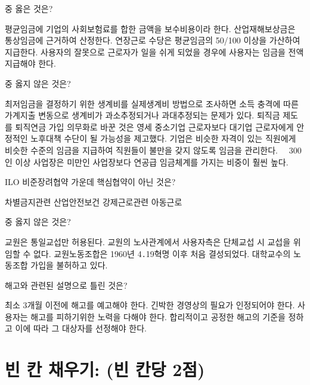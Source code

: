 \documentclass[11pt,answers]{exam} %
\begin{document}
\begin{questions}
 중 옳은 것은?
    \begin{choices}
    \CorrectChoice\relax 평균임금에 기업의 사회보험료를 합한 금액을 보수비용이라 한다.
    \choice\relax 산업재해보상금은 통상임금에 근거하여 산정한다.
    \choice\relax 연장근로 수당은 평균임금의 50/100 이상을 가산하여 지급한다.
    \choice\relax 사용자의 잘못으로 근로자가 일을 쉬게 되었을 경우에 사용자는 임금을 전액 지급해야 한다. 
    \end{choices}

 중 옳지 않은 것은?
    \begin{choices}
    \choice\relax 최저임금을 결정하기 위한 생계비를 실제생계비 방법으로 조사하면 소득 충격에 따른 가계지출 변동으로 생계비가 과소추정되거나 과대추정되는 문제가 있다. 
    \CorrectChoice\relax 퇴직금 제도를 퇴직연금 가입 의무화로 바꾼 것은 영세 중소기업 근로자보다 대기업 근로자에게 안정적인 노후대책 수단이 될 가능성을 제고했다.  
    \choice\relax 기업은 비슷한 자격이 있는 직원에게 비슷한 수준의 임금을 지급하여 직원들이 불만을 갖지 않도록 임금을 관리한다.
    \choice\relax　300인 이상 사업장은 미만인 사업장보다 연공급 임금체계를 가지는 비중이 훨씬 높다. 
    \end{choices}

 ILO 비준장려협약 가운데 핵심협약이 아닌 것은?
    \begin{choices}
    \choice\relax 차별금지관련
    \CorrectChoice\relax 산업안전보건
    \choice\relax 강제근로관련
    \choice\relax 아동근로
    \end{choices}

 중 옳지 않은 것은?
    \begin{choices}
    \choice\relax 교원은 통일교섭만 허용된다.
    \choice\relax 교원의 노사관계에서 사용자측은 단체교섭 시 교섭을 위임할 수 없다.
    \choice\relax 교원노동조합은 1960년 4․19혁명 이후 처음 결성되었다. 
    \CorrectChoice\relax 대학교수의 노동조합 가입을 불허하고 있다.
    \end{choices}

 해고와 관련된 설명으로 틀린 것은?
    \begin{choices}
    \CorrectChoice\relax 최소 3개월 이전에 해고를 예고해야 한다.
    \choice\relax 긴박한 경영상의 필요가 인정되어야 한다.
    \choice\relax 사용자는 해고를 피하기위한 노력을 다해야 한다.
    \choice\relax 합리적이고 공정한 해고의 기준을 정하고 이에 따라 그 대상자를 선정해야 한다.
    \end{choices}
\section*{빈 칸 채우기: (빈 칸당 2점)}


\end{questions}
\end{document}
